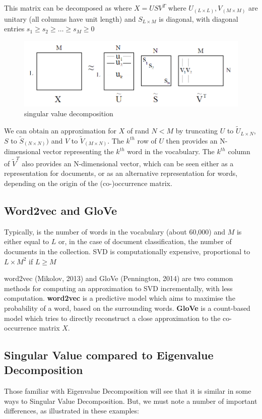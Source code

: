 \documentclass[11pt]{article}
\begin{document}
This matrix  can be decomposed as where $X = USV^T$ where $U_{(L \times L)}, V_{(M \times M)}$ are unitary (all columns have unit length) and $S_{L \times M}$ is diagonal, with diagonal entries $s_1 \geq s_2 \geq \dots \geq s_M \geq 0$

\begin{figure}[H]
    \centering
    \includegraphics{../out/images/singular-value-decomposition}
    \caption[singular value decomposition]{singular value decomposition}
    \label{fig:singular value decomposition}
\end{figure}

We can obtain an approximation for $X$ of rand $N < M$ by truncating $U$ to $\tilde{U}_{L \times N}$, $S$ to $\tilde{S}_{(N \times N)})$ and $V$ to $\tilde{V}_{(M \times N)}$.
The $k^{th}$ row of $U$ then provides an N-dimensional vector representing the $k^{th}$ word in the vocabulary.
The $k^{th}$ column of $\tilde{V}^T$ also provides an N-dimensional vector, which can be seen either as a representation for documents, or as an alternative representation for words, depending on the origin of the (co-)occurrence matrix.

\subsection{Word2vec and GloVe}\label{subsec:word2vec-and-glove}
Typically, is the number of words in the vocabulary (about 60,000) and $M$ is either equal to $L$ or, in the case of document classification, the number of documents in the collection.
SVD is computationally expensive, proportional to $L \times M^2$ if $L \geq M$

word2vec (Mikolov, 2013) and GloVe (Pennington, 2014) are two common methods for computing an approximation to SVD incrementally, with less computation.
\textbf{word2vec} is a predictive model which aims to maximise the probability of a word, based on the surrounding words.
\textbf{GloVe} is a count-based model which tries to directly reconstruct a close approximation to the co-occurrence matrix $X$.

\subsection{Singular Value compared to Eigenvalue Decomposition}\label{subsec:singular-value-compared-to-eigenvalue-decomposition}
Those familiar with Eigenvalue Decomposition will see that it is similar in some ways to Singular Value Decomposition.
But, we must note a number of important differences, as illustrated in these examples:
\end{document}
